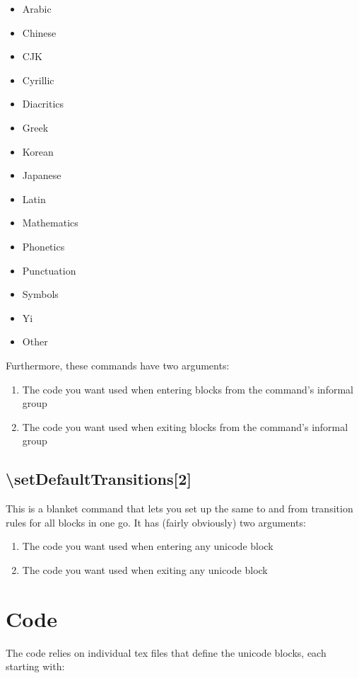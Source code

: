 ﻿\documentclass{article}
\newenvironment{itemlist}{%
  \begin{itemize}
	\setlength{\itemsep}{0pt}
	\setlength{\parsep}{0pt}
	\setlength{\topsep}{0pt}
	\setlength{\partopsep}{0pt}
	\setlength{\parskip}{0pt}
	\setlength{\labelsep}{5pt}}%
{
  \end{itemize}}
\newenvironment{numberlist}{%
  \begin{enumerate}
	\setlength{\itemsep}{0pt}
	\setlength{\parsep}{0pt}
	\setlength{\topsep}{0pt}
	\setlength{\partopsep}{0pt}
	\setlength{\parskip}{0pt}
	\setlength{\labelsep}{5pt}}%
{
  \end{enumerate}}
\begin{document}
			\begin{itemlist}
				\item Arabic
				\item Chinese
				\item CJK
				\item Cyrillic
				\item Diacritics
				\item Greek
				\item Korean
				\item Japanese
				\item Latin
				\item Mathematics
				\item Phonetics
				\item Punctuation
				\item Symbols
				\item Yi
				\item Other
			\end{itemlist}
			
			Furthermore, these commands have two arguments:
			
			\begin{numberlist}
				\item The code you want used when entering blocks from the command's informal group
				\item The code you want used when exiting blocks from the command's informal group
			\end{numberlist}
		
		\subsection{\textbackslash setDefaultTransitions[2]}
		
			This is a blanket command that lets you set up the same to and from transition rules for all blocks in one go. It has (fairly obviously) two arguments:
			
			\begin{numberlist}
				\item The code you want used when entering any unicode block
				\item The code you want used when exiting any unicode block
			\end{numberlist}

	\section{Code}
	
		The code relies on individual tex files that define the unicode blocks, each starting with:
		
\end{document}
